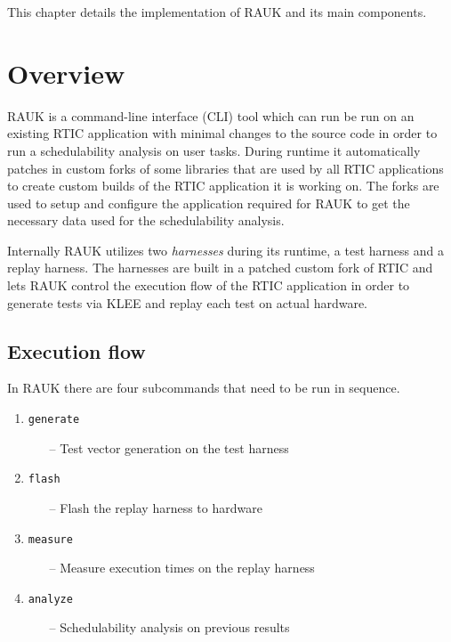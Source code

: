 This chapter details the implementation of RAUK and its main components.

\section{Overview}
RAUK is a command-line interface (CLI) tool which can run be run on an existing
RTIC application with minimal changes to the source code in order to run a
schedulability analysis on user tasks. During runtime it automatically patches
in custom forks of some libraries that are used by all RTIC applications to
create custom builds of the RTIC application it is working on. The forks are
used to setup and configure the application required for RAUK to get the
necessary data used for the schedulability analysis.

Internally RAUK utilizes two \emph{harnesses} during its runtime, a test
harness and a replay harness. The harnesses are built in a patched custom fork
of RTIC and lets RAUK control the execution flow of the RTIC application in
order to generate tests via KLEE and replay each test on actual hardware.

\subsection{Execution flow}
In RAUK there are four subcommands that need to be run in sequence.

\begin{enumerate}
    \item \texttt{generate}
    \begin{itemize}
        \item [--] Test vector generation on the test harness
    \end{itemize}
    \item \texttt{flash}
    \begin{itemize}
        \item [--] Flash the replay harness to hardware
    \end{itemize}
    \item \texttt{measure}
    \begin{itemize}
        \item [--] Measure execution times on the replay harness
    \end{itemize}
    \item \texttt{analyze}
    \begin{itemize}
        \item [--] Schedulability analysis on previous results
    \end{itemize}
\end{enumerate}


